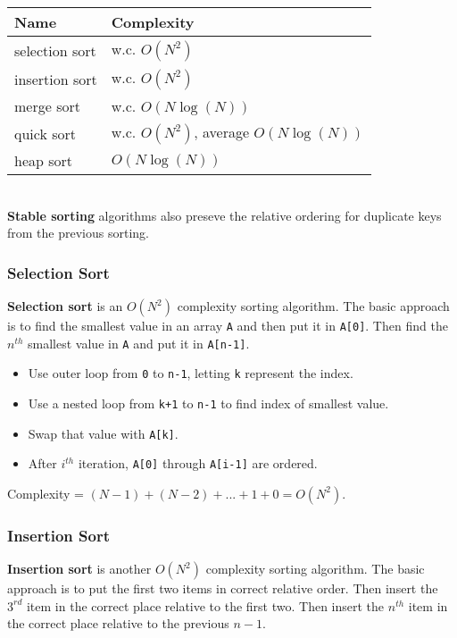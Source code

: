 \begin{tabular}{p{}p{}}
Name & Complexity \\
\hline
selection sort & w.c. $O(N^{2})$ \\
insertion sort & w.c. $O(N^{2})$ \\
merge sort & w.c. $O(N \log(N))$ \\
quick sort & w.c. $O(N^{2})$, average $O(N \log(N))$ \\
heap sort & $O(N \log(N))$ \\
\end{tabular} \\

\textbf{Stable sorting} algorithms also preseve the relative ordering for duplicate keys from the previous sorting. 

\subsubsection{Selection Sort}

\textbf{Selection sort} is an $O(N^{2})$ complexity sorting algorithm. The basic approach is to find the smallest value in an array \texttt{A} and then put it in \texttt{A[0]}. Then find the $n^{th}$ smallest value in \texttt{A} and put it in \texttt{A[n-1]}.

\begin{itemize}
	\item Use outer loop from \texttt{0} to \texttt{n-1}, letting \texttt{k} represent the index.
	\item Use a nested loop from \texttt{k+1} to \texttt{n-1} to find index of smallest value.
	\item Swap that value with \texttt{A[k]}. 
	\item After $i^{th}$ iteration, \texttt{A[0]} through \texttt{A[i-1]} are ordered.
\end{itemize}

Complexity = $(N-1) + (N-2) + ... + 1 + 0 = O(N^{2})$.

\subsubsection{Insertion Sort}

\textbf{Insertion sort} is another $O(N^{2})$ complexity sorting algorithm. The basic approach is to put the first two items in correct relative order. Then insert the $3^{rd}$ item in the correct place relative to the first two. Then insert the $n^{th}$ item in the correct place relative to the previous $n-1$. 

